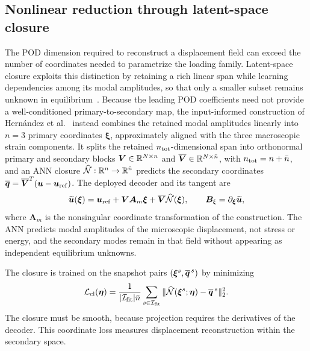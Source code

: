 \subsection{Nonlinear reduction through latent-space closure}
\label{sec:latent_closure}
The POD dimension required to reconstruct a displacement field can exceed the number of coordinates needed to parametrize the loading family. Latent-space closure exploits this distinction by retaining a rich linear span while learning dependencies among its modal amplitudes, so that only a smaller subset remains unknown in equilibrium~\cite{barnett2023,aresdeparga2026nonlinear}. Because the leading POD coefficients need not provide a well-conditioned primary-to-secondary map, the input-informed construction of Hern\'andez et al.~\cite{hernandez2026dimensional} instead combines the retained modal amplitudes linearly into $n=3$ primary coordinates $\bm\xi$, approximately aligned with the three macroscopic strain components. It splits the retained $n_{\rm tot}$-dimensional span into orthonormal primary and secondary blocks $\bm V\in\mathbb R^{N\times n}$ and $\overline{\bm V}\in\mathbb R^{N\times\bar n}$, with $n_{\rm tot}=n+\bar n$, and an ANN closure $\widehat{\mathcal N}:\mathbb R^n\to\mathbb R^{\bar n}$ predicts the secondary coordinates $\overline{\bm q}=\overline{\bm V}^T(\bm u-\bm u_{\rm ref})$. The deployed decoder and its tangent are
\begin{equation}
 \widetilde{\bm u}(\bm\xi)=\bm u_{\rm ref}
   +\bm V\bm A_m\bm\xi
   +\overline{\bm V}\widehat{\mathcal N}(\bm\xi),
 \qquad
 \bm B_\xi=\partial_{\bm\xi}\widetilde{\bm u},
 \label{eq:deployed_decoder}
\end{equation}
where $\bm A_m$ is the nonsingular coordinate transformation of the construction. The ANN predicts modal amplitudes of the microscopic displacement, not stress or energy, and the secondary modes remain in that field without appearing as independent equilibrium unknowns.

The closure is trained on the snapshot pairs $(\bm\xi^s,\overline{\bm q}^{\,s})$ by minimizing
\begin{equation}
 \mathcal L_{\rm cl}(\bm\eta)=
 \frac{1}{|\mathcal I_{\rm fit}|\bar n}
 \sum_{s\in\mathcal I_{\rm fit}}
 \|\widehat{\mathcal N}(\bm\xi^s;\bm\eta)-\overline{\bm q}^{\,s}\|_2^2.
 \label{eq:closure_loss}
\end{equation}
The closure must be smooth, because projection requires the derivatives of the decoder. This coordinate loss measures displacement reconstruction within the secondary space.

